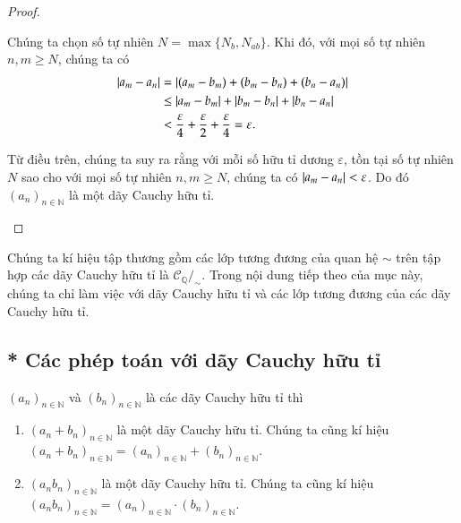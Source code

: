 \begin{proof}
\begin{enumerate}[label={(\roman*)},itemsep=0pt]
              Chúng ta chọn số tự nhiên $N = \max\{ N_{b}, N_{ab} \}$. Khi đó, với mọi số tự nhiên $n, m\geq N$, chúng ta có
              \begin{align*}
                  \left\vert{a_{m} - a_{n}}\right\vert & = \left\vert{(a_{m} - b_{m}) + (b_{m} - b_{n}) + (b_{n} - a_{n})}\right\vert                            \\
                                      & \leq \left\vert{a_{m} - b_{m}}\right\vert + \left\vert{b_{m} - b_{n}}\right\vert + \left\vert{b_{n} - a_{n}}\right\vert                   \\
                                      & < \frac{\varepsilon}{4} + \frac{\varepsilon}{2} + \frac{\varepsilon}{4} = \varepsilon.
              \end{align*}

              Từ điều trên, chúng ta suy ra rằng với mỗi số hữu tỉ dương $\varepsilon$, tồn tại số tự nhiên $N$ sao cho với mọi số tự nhiên $n, m\geq N$, chúng ta có $\left\vert{a_{m} - a_{n}}\right\vert < \varepsilon$. Do đó ${(a_{n})}_{n\in\mathbb{N}}$ là một dãy Cauchy hữu tỉ.
    \end{enumerate}
\end{proof}

Chúng ta kí hiệu tập thương gồm các lớp tương đương của quan hệ $\sim$ trên tập hợp các dãy Cauchy hữu tỉ là $\mathscr{C}_{\mathbb{Q}}/_{\sim}$. Trong nội dung tiếp theo của mục này, chúng ta chỉ làm việc với dãy Cauchy hữu tỉ và các lớp tương đương của các dãy Cauchy hữu tỉ.

\subsection{* Các phép toán với dãy Cauchy hữu tỉ}

\begin{theorem}\label{theorem:addition-and-multiplication-of-cauchy-sequences}
    ${(a_{n})}_{n\in\mathbb{N}}$ và ${(b_{n})}_{n\in\mathbb{N}}$ là các dãy Cauchy hữu tỉ thì
    \begin{enumerate}[label={(\roman*)}]
        \item ${(a_{n} + b_{n})}_{n\in\mathbb{N}}$ là một dãy Cauchy hữu tỉ. Chúng ta cũng kí hiệu ${(a_{n} + b_{n})}_{n\in\mathbb{N}} = {(a_{n})}_{n\in\mathbb{N}} + {(b_{n})}_{n\in\mathbb{N}}$.
        \item ${(a_{n}b_{n})}_{n\in\mathbb{N}}$ là một dãy Cauchy hữu tỉ. Chúng ta cũng kí hiệu ${(a_{n}b_{n})}_{n\in\mathbb{N}} = {(a_{n})}_{n\in\mathbb{N}}\cdot {(b_{n})}_{n\in\mathbb{N}}$.
    \end{enumerate}
\end{theorem}

